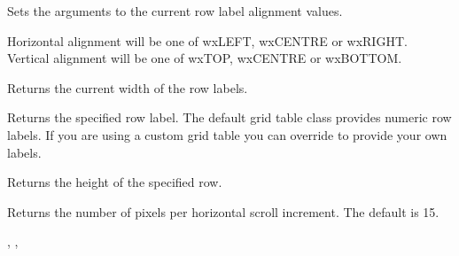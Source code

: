 \label{wxgridgetrowminimalheight}




\label{wxgridgetrowlabelalignment}


Sets the arguments to the current row label alignment values.

Horizontal alignment will be one of wxLEFT, wxCENTRE or wxRIGHT. \\
Vertical alignment will be one of wxTOP, wxCENTRE or wxBOTTOM.




\label{wxgridgetrowlabelsize}


Returns the current width of the row labels.



\label{wxgridgetrowlabelvalue}


Returns the specified row label. The default grid table class provides numeric row labels.
If you are using a custom grid table you can override
 to provide
your own labels.



\label{wxgridgetrowsize}


Returns the height of the specified row.



\label{wxgridgetscrolllinex}


Returns the number of pixels per horizontal scroll increment. The default is 15.


,\rtfsp
{},\rtfsp
{}



